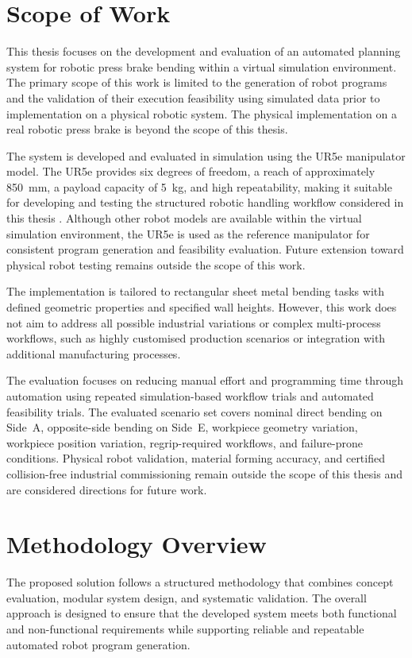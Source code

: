 \section{Scope of Work}
\label{sec:introduction-scope-of-work}

This thesis focuses on the development and evaluation of an automated planning system for robotic press brake bending within a virtual simulation environment. The primary scope of this work is limited to the generation of robot programs and the validation of their execution feasibility using simulated data prior to implementation on a physical robotic system. The physical implementation on a real robotic press brake is beyond the scope of this thesis.

The system is developed and evaluated in simulation using the UR5e manipulator model. The UR5e provides six degrees of freedom, a reach of approximately 850~mm, a payload capacity of 5~kg, and high repeatability, making it suitable for developing and testing the structured robotic handling workflow considered in this thesis \cite{universalrobots_ur5e}. Although other robot models are available within the virtual simulation environment, the UR5e is used as the reference manipulator for consistent program generation and feasibility evaluation. Future extension toward physical robot testing remains outside the scope of this work.

The implementation is tailored to rectangular sheet metal bending tasks with defined geometric properties and specified wall heights. However, this work does not aim to address all possible industrial variations or complex multi-process workflows, such as highly customised production scenarios or integration with additional manufacturing processes.

The evaluation focuses on reducing manual effort and programming time through automation using repeated simulation-based workflow trials and automated feasibility trials. The evaluated scenario set covers nominal direct bending on Side~A, opposite-side bending on Side~E, workpiece geometry variation, workpiece position variation, regrip-required workflows, and failure-prone conditions. Physical robot validation, material forming accuracy, and certified collision-free industrial commissioning remain outside the scope of this thesis and are considered directions for future work.


\section{Methodology Overview}
\label{sec:introduction-methodology-overview}
 The proposed solution follows a structured methodology that combines concept evaluation, modular system design, and systematic validation. The overall approach is designed to ensure that the developed system meets both functional and non-functional requirements while supporting reliable and repeatable automated robot program generation.

